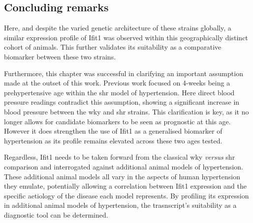 \subsection{Concluding remarks}

Here, and despite the varied genetic architecture of these strains globally, a similar expression profile of Ifit1 was observed within this geographically distinct cohort of animals. This further validates its suitability as a comparative biomarker between these two strains. 

Furthermore, this chapter was successful in clarifying an important assumption made at the outset of this work. Previous work focused on 4-weeks being a prehypertensive age within the \acrshort{shr} model of hypertension. Here direct blood pressure readings contradict this assumption, showing a significant increase in blood pressure between the \acrshort{wky} and \acrshort{shr} strains. This clarification is key, as it no longer allows for candidate biomarkers to be seen as prognostic at this age. However it does strengthen the use of Ifit1 as a generalised biomarker of hypertension as its profile remains elevated across these two ages tested. 

Regardless, Ifit1 needs to be taken forward from the classical \acrshort{wky} \textit{versus} \acrshort{shr} comparison and interrogated against additional animal models of hypertension. These additional animal models all vary in the aspects of human hypertension they emulate, potentially allowing a correlation between Ifit1 expression and the specific aetiology of the disease each model represents. By profiling its expression in additional animal models of hypertension, the trasnscript's suitability as a diagnostic tool can be determined.
